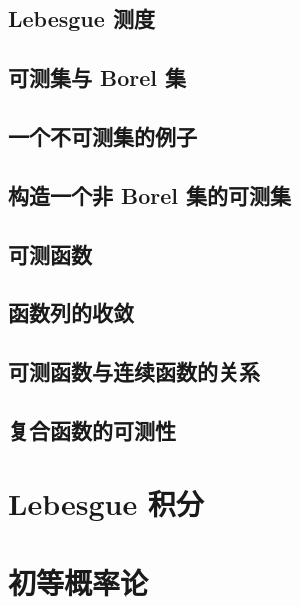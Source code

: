 \documentclass[cn,toc=twocol]{elegantbook}
\begin{document}
\section{Lebesgue 测度}

\section{可测集与 Borel 集}

\section{一个不可测集的例子}

\section{构造一个非 Borel 集的可测集}

\section{可测函数}

\section{函数列的收敛}

\section{可测函数与连续函数的关系}

\section{复合函数的可测性}


\chapter{Lebesgue 积分}


\chapter{初等概率论}
\end{document}
